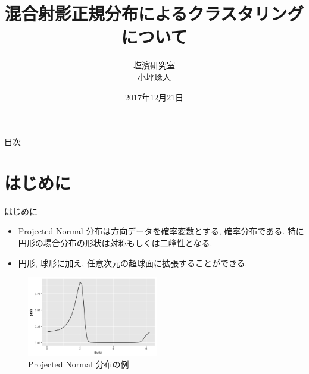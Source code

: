 \documentclass[dvipdfmx]{beamer}
\title[タイトル]{混合射影正規分布によるクラスタリングについて}
\author[発表者名]{塩濱研究室\\ 小坪琢人}
\institute[所属]{東京理科大学\ 工学部経営工学科4年\\学籍番号 4414036}
\date[日付]{2017年12月21日}
\begin{document}
\begin{frame}[plain]
\titlepage
\end{frame}
	
\begin{frame}{目次}
\tableofcontents
\end{frame}

\section{はじめに}
\begin{frame}{はじめに}

\begin{itemize}

\item Projected Normal 分布は方向データを確率変数とする, 確率分布である. 特に円形の場合分布の形状は対称もしくは二峰性となる.

\item 円形, 球形に加え, 任意次元の超球面に拡張することができる.  \cite{GPN}

\end{itemize}

\vspace{-0.3cm}
\begin{figure}[H]
\begin{center}
\includegraphics[clip,height= 35mm]{data/PN_sample1.png}
\end{center}
\caption{Projected Normal 分布の例}
\label{pnsample1}
\end{figure}

\end{frame}
\end{document}
